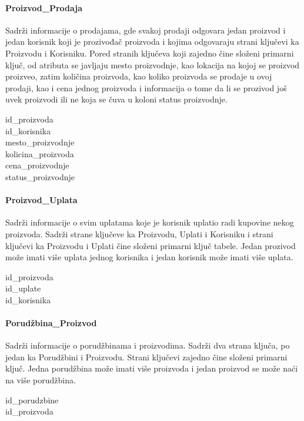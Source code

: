 \documentclass[a4paper, oneside]{article}
\begin{document}
\paragraph{Proizvod\_Prodaja}
Sadrži informacije o prodajama, gde svakoj prodaji odgovara jedan proizvod i jedan korisnik koji je prozivođač proizvoda i kojima odgovaraju strani ključevi ka Proizvodu i Korisniku. Pored stranih ključeva koji zajedno čine složeni primarni ključ, od atributa se javljaju mesto proizvodnje, kao lokacija na kojoj se proizvod proizveo, zatim količina proizvoda, kao koliko proizvoda se prodaje u ovoj prodaji, kao i cena jednog proizvoda i informacija o tome da li se prozivod još uvek proizvodi ili ne koja se čuva u koloni status proizvodnje.
\begin{description}
    \item[id\_proizvoda]
    \item[id\_korisnika]
    \item[mesto\_proizvodnje]
    \item[kolicina\_proizvoda]
    \item[cena\_proizvodnje]
    \item[status\_proizvodnje]
\end{description}
\paragraph{Proizvod\_Uplata} Sadrži informacije o svim uplatama koje je korisnik uplatio radi kupovine nekog proizvoda. Sadrži strane ključeve ka Proizvodu, Uplati i Korisniku i strani ključevi ka Proizvodu i Uplati čine složeni primarni ključ tabele. Jedan prozivod može imati više uplata jednog korisnika i jedan korisnik može imati više uplata.
\begin{description}
    \item[id\_proizvoda]
    \item[id\_uplate]
    \item[id\_korisnika]
\end{description}
\paragraph{Porudžbina\_Proizvod} Sadrži informacije o porudžbinama i proizvodima. Sadrži dva strana ključa, po jedan ka Porudžbini i Proizvodu. Strani ključevi zajedno čine složeni primarni ključ. Jedna porudžbina može imati više proizvoda i jedan proizvod se može naći na više porudžbina.
\begin{description}
    \item[id\_porudzbine]
    \item[id\_proizvoda]
\end{description}
\end{document}
